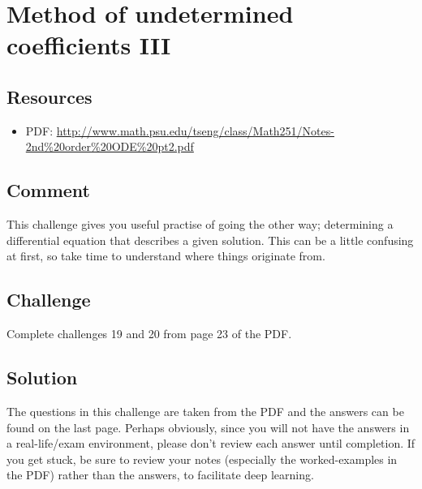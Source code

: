 \timebox




\newpage
\section{Method of undetermined coefficients III}

\subsection*{Resources}
\begin{itemize}
    \item PDF: \url{http://www.math.psu.edu/tseng/class/Math251/Notes-2nd\%20order\%20ODE\%20pt2.pdf}
\end{itemize}

\subsection*{Comment}
This challenge gives you useful practise of going the other way; determining a differential equation that describes a given solution. This can be a little confusing at first, so take time to understand where things originate from.

\subsection*{Challenge}
Complete challenges 19 and 20 from page 23 of the PDF.

\subsection*{Solution}
The questions in this challenge are taken from the PDF and the answers can be found on the last page. Perhaps obviously, since you will not have the answers in a real-life/exam environment, please don't review each answer until completion. If you get stuck, be sure to review your notes (especially the worked-examples in the PDF) rather than the answers, to facilitate deep learning. 


